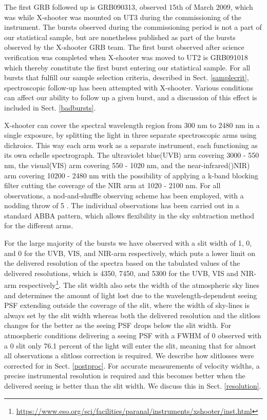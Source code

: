 \documentclass{aa}    %
\begin{document}
The first GRB followed up is GRB090313, observed 15th of March 2009, which was
while X-shooter was mounted on UT3 during the commissioning of the instrument.
The bursts observed during the commissioning period is not a part of our
statistical sample, but are nonetheless published as part of the bursts observed
by the X-shooter GRB team. The first burst observed after science verification
was completed when X-shooter was moved to UT2 is GRB091018 which thereby
constitute the first burst entering our statistical sample. For all bursts that
fulfill our sample selection criteria, described in Sect. \ref{samplecrit},
spectroscopic follow-up has been attempted with X-shooter. Various conditions
can affect our ability to follow up a given burst, and a discussion of this
effect is included in Sect. \ref{badbursts}.

X-shooter can cover the spectral wavelength region from 300 nm to 2480 nm in a
single exposure, by splitting the light in three separate spectroscopic arms
using dichroics.  This way each arm work as a separate instrument, each
functioning as its own echelle spectrograph.  The ultraviolet blue(UVB) arm
covering 3000 - 550 nm, the visual(VIS) arm covering 550 - 1020 nm, and the
near-infrared()NIR) arm covering 10200 - 2480 nm with the possibility of
applying a k-band blocking filter cutting the coverage of the NIR arm at 1020 -
2100 nm. For all observations, a nod-and-shuffle observing scheme has been
employed, with a nodding throw of 5 \arcsec. The individual observations has
been carried out in a standard ABBA pattern, which allows flexibility in the sky
subtraction method for the different arms.

For the large majority of the bursts we have observed with a slit width of
1, 0, and 0 for the UVB, VIS, and NIR-arm respectively, which
puts a lower limit on the delivered resolution of the spectra based on the
tabulated values of the delivered resolutions, which is 4350, 7450, and 5300 for
the UVB, VIS and NIR-arm respectively\footnote{\url{https://www.eso.org/sci/facilities/paranal/instruments/xshooter/inst.html}}.
The slit width also sets the width of the atmospheric sky lines and determines
the amount of light lost due to the wavelength-dependent seeing PSF extending
outside the coverage of the slit, where the width of sky-lines is always set by
the slit width whereas both the delivered resolution and the slitloss changes
for the better as the seeing PSF drops below the slit width.
For atmospheric conditions delivering a seeing PSF with a FWHM of 0
observed with a 0 slit only 76.1 percent of the light will enter the slit,
meaning that for almost all observations a slitloss correction is required. We
describe how slitlosses were corrected for in Sect. \ref{postproc}.
For accurate measurements of velocity widths, a precise instrumental resolution
is required and this becomes better when the delivered seeing is better than the
slit width. We discuss this in Sect. \ref{resolution}.
\end{document}
